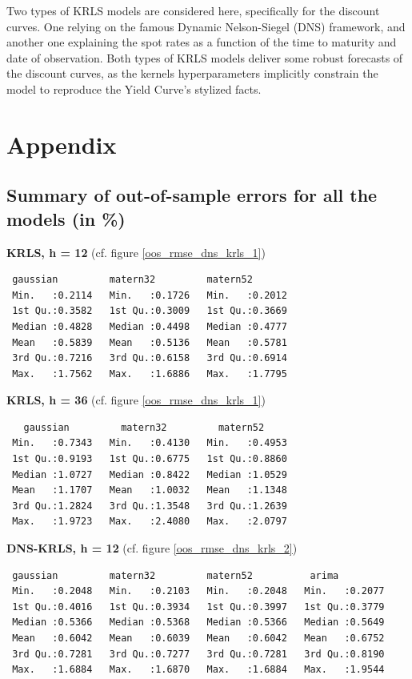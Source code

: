 Two types of KRLS models are considered here, specifically for the discount curves. One relying on the famous Dynamic Nelson-Siegel (DNS) framework, and another one explaining the spot rates as a function of the time to maturity and date of observation. Both types of KRLS models deliver some robust forecasts of the discount curves, as the kernels hyperparameters implicitly constrain the model to reproduce the Yield Curve's stylized facts. 

\newpage

\section{Appendix}

\subsection{Summary of out-of-sample errors for all the models (in \%)}
\label{appendix_oos_rmse}

\textbf{KRLS, h = 12} (cf. figure \ref{oos_rmse_dns_krls_1})

\begin{verbatim}
 gaussian         matern32         matern52     
 Min.   :0.2114   Min.   :0.1726   Min.   :0.2012  
 1st Qu.:0.3582   1st Qu.:0.3009   1st Qu.:0.3669  
 Median :0.4828   Median :0.4498   Median :0.4777  
 Mean   :0.5839   Mean   :0.5136   Mean   :0.5781  
 3rd Qu.:0.7216   3rd Qu.:0.6158   3rd Qu.:0.6914  
 Max.   :1.7562   Max.   :1.6886   Max.   :1.7795  
\end{verbatim}

\textbf{KRLS, h = 36} (cf. figure \ref{oos_rmse_dns_krls_1}) 

\begin{verbatim}
   gaussian         matern32         matern52     
 Min.   :0.7343   Min.   :0.4130   Min.   :0.4953  
 1st Qu.:0.9193   1st Qu.:0.6775   1st Qu.:0.8860  
 Median :1.0727   Median :0.8422   Median :1.0529  
 Mean   :1.1707   Mean   :1.0032   Mean   :1.1348  
 3rd Qu.:1.2824   3rd Qu.:1.3548   3rd Qu.:1.2639  
 Max.   :1.9723   Max.   :2.4080   Max.   :2.0797 
\end{verbatim}

\textbf{DNS-KRLS, h = 12} (cf. figure \ref{oos_rmse_dns_krls_2})

\begin{verbatim}
 gaussian         matern32         matern52          arima       
 Min.   :0.2048   Min.   :0.2103   Min.   :0.2048   Min.   :0.2077  
 1st Qu.:0.4016   1st Qu.:0.3934   1st Qu.:0.3997   1st Qu.:0.3779  
 Median :0.5366   Median :0.5368   Median :0.5366   Median :0.5649  
 Mean   :0.6042   Mean   :0.6039   Mean   :0.6042   Mean   :0.6752  
 3rd Qu.:0.7281   3rd Qu.:0.7277   3rd Qu.:0.7281   3rd Qu.:0.8190  
 Max.   :1.6884   Max.   :1.6870   Max.   :1.6884   Max.   :1.9544 
\end{verbatim}

